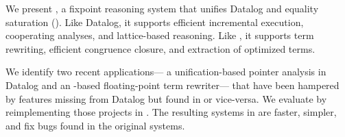 We present \egglog,
 a fixpoint reasoning
 system that unifies
 Datalog and equality saturation (\eqsat).
Like Datalog,
 it supports efficient incremental execution,
 cooperating analyses,
 and lattice-based reasoning.
Like \eqsat,
 it supports term rewriting,
 efficient congruence closure,
 and extraction of optimized terms.

We identify two recent applications---%
 a unification-based pointer analysis in Datalog
 and an \eqsat-based floating-point term rewriter---%
 that have been hampered
 by features missing from Datalog but found in \eqsat
 or vice-versa.
We evaluate \egglog by reimplementing
 those projects in \egglog.
The resulting systems in \egglog are 
 faster, simpler, and fix bugs 
 found in the original systems.

